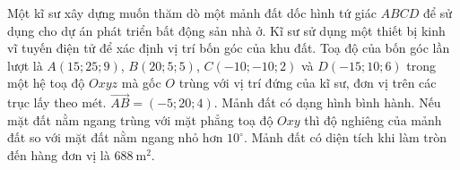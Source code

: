 \begin{ex}
Một kĩ sư xây dựng muốn thăm dò một mảnh đất dốc hình tứ giác $ABCD$ để sử dụng cho dự án phát triển bất động sản nhà ở. Kĩ sư sử dụng một thiết bị kinh vĩ tuyến điện tử để xác định vị trí bốn góc của khu đất. Toạ độ của bốn góc lần lượt là $A(15;25;9)$, $B(20;5;5)$, $C(-10;-10;2)$ và $D(-15;10;6)$ trong một hệ toạ độ $Oxyz$ mà gốc $O$ trùng với vị trí đứng của kĩ sư, đơn vị trên các trục lấy theo mét.
\choiceTF
{$\overrightarrow{AB}=(-5;20;4)$.}
{\True Mảnh đất có dạng hình bình hành.}
{Nếu mặt đất nằm ngang trùng với mặt phẳng toạ độ $Oxy$ thì độ nghiêng của mảnh đất so với mặt đất nằm ngang nhỏ hơn $10^\circ$.}
{\True Mảnh đất có diện tích khi làm tròn đến hàng đơn vị là $688\ \mathrm m^2$.}
\end{ex}
